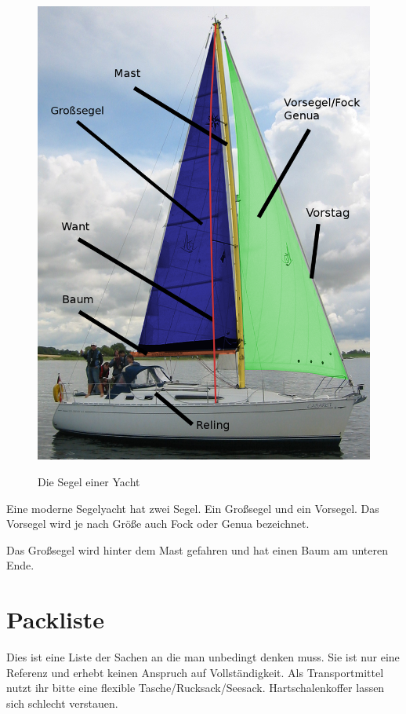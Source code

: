 \documentclass[12pt]{article}
\begin{document}
\begin{figure}[h!]
\begin{center}
\label{segel}
\includegraphics[scale=0.2]{bilder/yacht.png}
\end{center}
\caption{Die Segel einer Yacht}
\end{figure}

Eine moderne Segelyacht hat zwei Segel. Ein Großsegel und ein Vorsegel.
Das Vorsegel wird je nach Größe auch Fock oder Genua bezeichnet.

Das Großsegel wird hinter dem Mast gefahren und hat einen Baum am unteren Ende.

\section{Packliste}
Dies ist eine Liste der Sachen an die man unbedingt denken muss. Sie ist nur eine Referenz und erhebt keinen Anspruch auf Vollständigkeit. Als Transportmittel nutzt ihr bitte eine flexible Tasche/Rucksack/Seesack. Hartschalenkoffer lassen sich schlecht verstauen.
\end{document}
